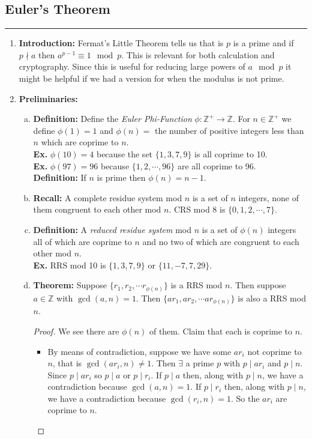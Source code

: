 \documentclass[class=article, crop=false]{standalone}
\def\integers{{\mathbb Z}}
\begin{document}
\subsection{Euler's Theorem}
\rule{\textwidth}{1pt}
\begin{enumerate}[1.]
	\item \textbf{Introduction:}
	Fermat's Little Theorem tells us that is $p$ is a prime and if $p\nmid a$ then
	$a^{p-1}\equiv 1\mod p$. This is relevant for both calculation and cryptography.
	Since this is useful for reducing large powers of $a\mod p$
	it might be helpful if we had a version for when the modulus is not prime.

	\item \textbf{Preliminaries:}
	\begin{enumerate}[(a)]
		\item \textbf{Definition:} Define the \emph{Euler Phi-Function}
		$\phi: \integers^+ \rightarrow \integers$. For $n\in\integers^+$ we define
		$\phi(1)=1$ and $\phi(n)=$ the number of positive integers less than $n$ which are coprime
		to $n$.\\
		\textbf{Ex.} $\phi(10)=4$ because the set $\{1,3,7,9\}$ is all coprime to 10. \\
		\textbf{Ex.} $\phi(97)=96$ because $\{1,2,\cdots,96\}$ are all coprime to 96. \\
		\textbf{Definition:} If $n$ is prime then $\phi(n)=n-1$.

		\item \textbf{Recall:} A complete residue system mod $n$ is a set of $n$ integers,
		none of them congruent to each other mod $n$. CRS mod 8 is $\{0,1,2,\cdots,7\}$.
		
		
		\item \textbf{Definition:} A \emph{reduced residue system} mod $n$ is a set of
		$\phi(n)$ integers all of which are coprime to $n$ and no two of which are congruent to each
		other mod $n$.\\
		\textbf{Ex.} RRS mod 10 is $\{1,3,7,9\}$ or $\{11,-7,7,29\}$.
		
		\item \textbf{Theorem:} Suppose $\{r_1, r_2,\cdots r_{\phi(n)}\}$ is a RRS mod $n$.
		Then suppose $a\in\integers$ with $\gcd(a,n)=1$. Then
		$\{ar_1, ar_2, \cdots ar_{\phi(n)}\}$ is also a RRS mod $n$.
		\begin{proof}
			We see there are $\phi(n)$ of them. Claim that each is coprime to $n$.
			\begin{itemize}
			\item By means of contradiction, suppose we have some $ar_i$ not coprime to $n$, 
			that is $\gcd(ar_i,n)\neq 1$. Then $\exists $ a prime $p$ with
			$p\mid ar_i$ and $p\mid n$. Since $p\mid ar_i$ so $p\mid a$ or $p\mid r_i$.
			If $p\mid a$ then, along with $p\mid n$, we have a contradiction because
			$\gcd(a,n)=1$. If $p\mid r_i$ then, along with $p\mid n$, we have a contradiction
			because $\gcd(r_i,n)=1$. So the $ar_i$ are coprime to $n$.


\end{itemize}
\end{proof}
\end{enumerate}
\end{enumerate}
\end{document}
